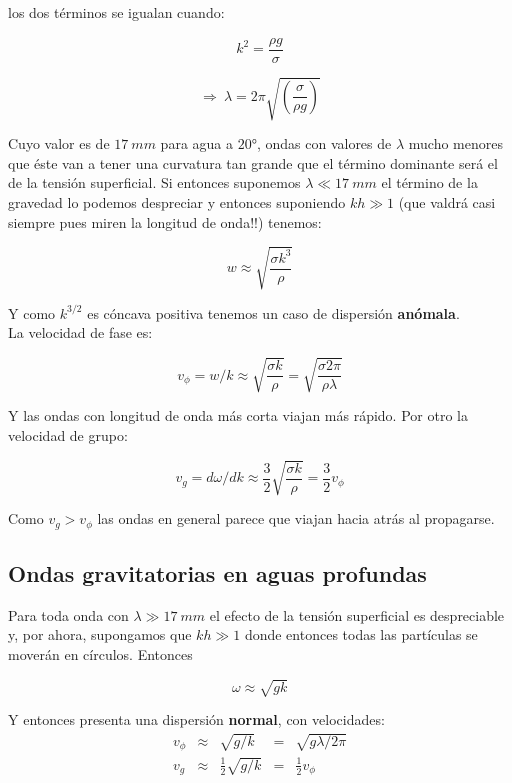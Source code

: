 \documentclass[a4paper,spanish]{article}
\numberwithin{equation}{section}
\begin{document}
los dos t\'erminos se igualan cuando:

\[k^2=\frac{\rho g}{\sigma}\]

\[ \Longrightarrow \ \lambda= 2 \pi \sqrt{\left(\frac{\sigma}{\rho g}\right)} \]

Cuyo valor es de $17 \ mm$ para agua a $20°$, ondas con valores de $\lambda$ mucho menores que \'este van a tener una curvatura tan grande que el t\'ermino dominante ser\'a el de la tensi\'on superficial. Si entonces suponemos $\lambda \ll 17 \ mm$ el t\'ermino de la gravedad lo podemos despreciar y entonces suponiendo $kh \gg 1$ (que valdr\'a casi siempre pues miren la longitud de onda!!) tenemos:

\begin{equation}
w\approx \sqrt{\frac{\sigma k^3}{\rho}}
\end{equation}

Y como $k^{3/2}$ es c\'oncava positiva tenemos un caso de dispersi\'on \textbf{an\'omala}.\\
La velocidad de fase es:

\[v_{\phi}=w / k \approx \sqrt{\frac{\sigma k}{\rho}} = \sqrt{\frac{\sigma 2 \pi}{\rho \lambda}} \]

Y las ondas con longitud de onda m\'as corta viajan m\'as r\'apido. Por otro la velocidad de grupo:

\[ v_g = d\omega / dk \approx \frac{3}{2}\sqrt{\frac{\sigma k}{\rho}} = \frac{3}{2}v_{\phi}
\]

Como $v_g > v_{\phi}$ las ondas en general parece que viajan hacia atr\'as al propagarse.

\subsection*{Ondas gravitatorias en aguas profundas}
Para toda onda con $\lambda \gg 17 \ mm$ el efecto de la tensi\'on superficial es despreciable y, por ahora, supongamos que $kh \gg 1$ donde entonces todas las part\'iculas se mover\'an en c\'irculos. Entonces

\begin{equation}
\omega\approx \sqrt{gk}
\end{equation}

Y entonces presenta una dispersi\'on \textbf{normal}, con velocidades:
\[
\begin{array}{rcccl}
v_{\phi} & \approx & \sqrt{g / k} & = & \sqrt{g \lambda / 2 \pi} \\
v_g & \approx & \frac{1}{2}\sqrt{g / k} & = & \frac{1}{2}v_{\phi} 
\end{array}
\]
\end{document}
